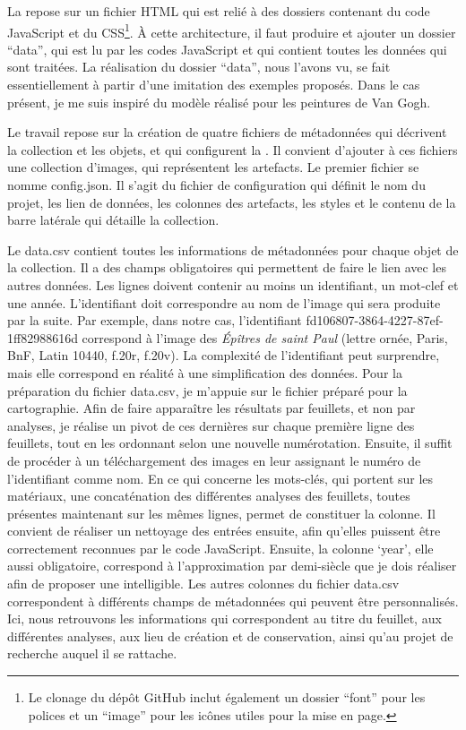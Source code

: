 La  repose sur un fichier HTML qui est relié à des dossiers contenant du code JavaScript et du CSS\footnote{Le clonage du dépôt GitHub inclut également un dossier \enquote{font} pour les polices et un \enquote{image} pour les icônes utiles pour la mise en page.}. À cette architecture, il faut produire et ajouter un dossier \enquote{data}, qui est lu par les codes JavaScript et qui contient toutes les données qui sont traitées. La réalisation du dossier \enquote{data}, nous l’avons vu, se fait essentiellement à partir d’une imitation des exemples proposés. Dans le cas présent, je me suis inspiré du modèle réalisé pour les peintures de Van Gogh.\\\par 
Le travail repose sur la création de quatre fichiers de métadonnées qui décrivent la collection et les objets, et qui configurent la . Il convient d’ajouter à ces fichiers une collection d’images, qui représentent les artefacts. Le premier fichier se nomme config.json. Il s'agit du fichier de configuration qui définit le nom du projet, les lien de données, les colonnes des artefacts, les styles et le contenu de la barre latérale qui détaille la collection.\par
Le data.csv contient toutes les informations de métadonnées pour chaque objet de la collection. Il a des champs obligatoires qui permettent de faire le lien avec les autres données. Les lignes doivent contenir au moins un identifiant, un mot-clef et une année. L’identifiant doit correspondre au nom de l’image qui sera produite par la suite. Par exemple, dans notre cas, l’identifiant fd106807-3864-4227-87ef-1ff82988616d correspond à l’image des \textit{Épîtres de saint Paul} (lettre ornée, Paris, BnF, Latin 10440, f.20r, f.20v). La complexité de l’identifiant peut surprendre, mais elle correspond en réalité à une simplification des données. Pour la préparation du fichier data.csv, je m’appuie sur le fichier préparé pour la cartographie. Afin de faire apparaître les résultats par feuillets, et non par analyses, je réalise un pivot de ces dernières sur chaque première ligne des feuillets, tout en les ordonnant selon une nouvelle numérotation. Ensuite, il suffit de procéder à un téléchargement des images en leur assignant le numéro de l’identifiant comme nom. En ce qui concerne les mots-clés, qui portent sur les matériaux, une concaténation des différentes analyses des feuillets, toutes présentes maintenant sur les mêmes lignes, permet de constituer la colonne. Il convient de réaliser un nettoyage des entrées ensuite, afin qu’elles puissent être correctement reconnues par le code JavaScript. Ensuite, la colonne ‘year’, elle aussi obligatoire, correspond à l’approximation par demi-siècle que je dois réaliser afin de proposer une  intelligible. Les autres colonnes du fichier data.csv correspondent à différents champs de métadonnées qui peuvent être personnalisés. Ici, nous retrouvons les informations qui correspondent au titre du feuillet, aux différentes analyses, aux lieu de création et de conservation, ainsi qu’au projet de recherche auquel il se rattache.\par
